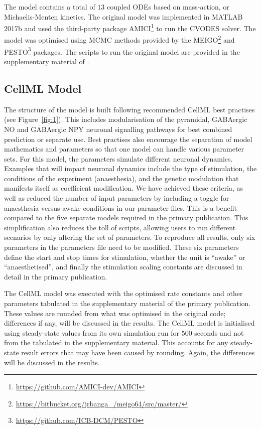 \documentclass[fleqn,10pt]{physiome}
\begin{document}
The model contains a total of $13$ coupled ODEs based on mass-action, or Michaelis-Menten kinetics. The original model was implemented in MATLAB 2017b and used the third-party package AMICI\footnote{\url{https://github.com/AMICI-dev/AMICI}} to run the CVODES solver. The model was optimised using MCMC methods provided by the MEIGO\footnote{\url{https://bitbucket.org/jrbanga\_/meigo64/src/master/}} and PESTO\footnote{\url{https://github.com/ICB-DCM/PESTO}} packages. The scripts to run the original model are provided in the supplementary material of \cite{Sten2020}.


\subsection{CellML Model}

The structure of the model is built following recommended CellML best practises (see Figure~\ref{fig:1}). This includes modularisation of the pyramidal, GABAergic NO and GABAergic NPY neuronal signalling pathways for best combined prediction or separate use. Best practises also encourage the separation of model mathematics and parameters so that one model can handle various parameter sets. For this model, the parameters simulate different neuronal dynamics. Examples that will impact neuronal dynamics include the type of stimulation, the conditions of the experiment (anaesthesia), and the genetic modulation that manifests itself as coefficient modification. We have achieved these criteria, as well as reduced the number of input parameters by including a toggle for anaesthesia versus awake conditions in our parameter files. This is a benefit compared to the five separate models required in the primary publication. This simplification also reduces the toll of scripts, allowing users to run different scenarios by only altering the set of parameters. To reproduce all results, only six parameters in the parameters file need to be modified. These six parameters define the start and stop times for stimulation, whether the unit is ``awake'' or ``anaesthetised'', and finally the stimulation scaling constants are discussed in detail in the primary publication.

The CellML model was executed with the optimised rate constants and other parameters tabulated in the supplementary material of the primary publication. These values are rounded from what was optimised in the original code; differences if any, will be discussed in the results. The CellML model is initialised using steady-state values from its own simulation run for $500$ seconds and not from the tabulated in the supplementary material. This accounts for any steady-state result errors that may have been caused by rounding. Again, the differences will be discussed in the results.
\end{document}
